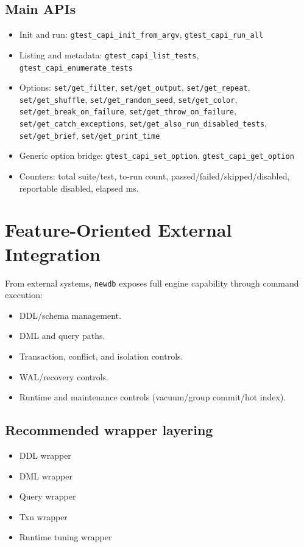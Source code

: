 \documentclass[11pt,a4paper]{article}
\begin{document}
\subsection{Main APIs}
\begin{itemize}
  \item Init and run:
  \texttt{gtest\_capi\_init\_from\_argv},
  \texttt{gtest\_capi\_run\_all}
  \item Listing and metadata:
  \texttt{gtest\_capi\_list\_tests},
  \texttt{gtest\_capi\_enumerate\_tests}
  \item Options:
  \texttt{set/get\_filter},
  \texttt{set/get\_output},
  \texttt{set/get\_repeat},
  \texttt{set/get\_shuffle},
  \texttt{set/get\_random\_seed},
  \texttt{set/get\_color},
  \texttt{set/get\_break\_on\_failure},
  \texttt{set/get\_throw\_on\_failure},
  \texttt{set/get\_catch\_exceptions},
  \texttt{set/get\_also\_run\_disabled\_tests},
  \texttt{set/get\_brief},
  \texttt{set/get\_print\_time}
  \item Generic option bridge:
  \texttt{gtest\_capi\_set\_option},
  \texttt{gtest\_capi\_get\_option}
  \item Counters:
  total suite/test, to-run count, passed/failed/skipped/disabled,
  reportable disabled, elapsed ms.
\end{itemize}

\section{Feature-Oriented External Integration}
From external systems, \texttt{newdb} exposes full engine capability through command execution:
\begin{itemize}
  \item DDL/schema management.
  \item DML and query paths.
  \item Transaction, conflict, and isolation controls.
  \item WAL/recovery controls.
  \item Runtime and maintenance controls (vacuum/group commit/hot index).
\end{itemize}

\subsection{Recommended wrapper layering}
\begin{itemize}
  \item DDL wrapper
  \item DML wrapper
  \item Query wrapper
  \item Txn wrapper
  \item Runtime tuning wrapper
\end{itemize}
\end{document}
